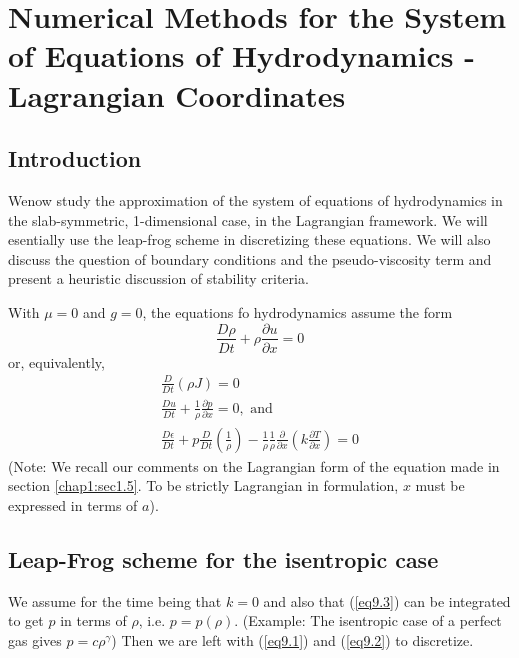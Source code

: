 
\chapter[Numerical Methods for the System of Equations
  of...]{Numerical Methods for the System of Equations of 
  Hydrodynamics - Lagrangian Coordinates}\label{chap9} 

\section{Introduction}\label{chap9:sec9.1}

We\pageoriginale now study the approximation of the system of
equations of hydrodynamics in the slab-symmetric, 1-dimensional case,
in the Lagrangian framework. We will esentially use the leap-frog
scheme in discretizing these equations. We will also discuss the
question of boundary conditions  and the pseudo-viscosity term and
present a heuristic discussion of stability criteria. 

With $\mu = 0$ and $g= 0$, the equations fo hydrodynamics assume the form 
\begin{equation*}
\frac{D\rho}{Dt} + \rho \frac{\partial u}{\partial x} = 0\tag{9.1}\label{eq9.1}
\end{equation*}
or, equivalently,
\begin{gather*}
\frac{D }{D t} (\rho J) = 0 \tag*{$(9.1')$}\label{eq9.1'}\\
\frac{D u}{D t} + \frac{1}{\rho} \frac{\partial p}{\partial x} = 0, \text{ and } \tag{9.2}\label{eq9.2}\\
\frac{D \epsilon}{D t } + p \frac{D}{D t} \left(\frac{1}{\rho}\right) -
\frac{1}{\rho}  \frac{1}{\rho} \frac{\partial}{\partial x} \left(k
\frac{\partial T}{\partial x}\right) = 0 \tag{9.3}\label{eq9.3}  
\end{gather*}
(Note: We recall our comments on the Lagrangian form of the equation made in section \ref{chap1:sec1.5}. To be strictly Lagrangian in formulation, $x$ must be expressed in terms of $a$).

\section{Leap-Frog scheme for the isentropic case}\label{chap9:sec9.2}

We assume for the time being that $k=0$ and also that (\ref{eq9.3}) can be integrated to get $p$ in terms of $\rho$, i.e. $p = p (\rho)$. (Example: The isentropic case of a perfect gas gives $p=c \rho^\gamma$) Then we are left with (\ref{eq9.1}) and (\ref{eq9.2}) to discretize.


